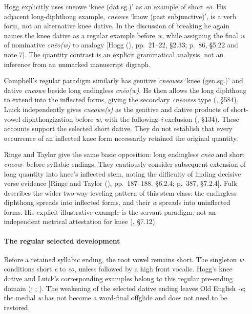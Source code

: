 \documentclass[
  british,
  a4paper,
]{article}
\begin{document}
Hogg explicitly uses {cneowe} `knee (dat.sg.)' as an example of short
\emph{eo}. His adjacent long-diphthong example, \emph{cnēowe} `know
(past subjunctive)', is a verb form, not an alternative knee dative. In
the discussion of breaking he again names the knee dative as a regular
example before \emph{w}, while assigning the final \emph{w} of
nominative \emph{cnēo(w)} to analogy {[}Hogg
(), pp.~21--22, §2.33; p.~86, §5.22
and note 7{]}. The quantity contrast is an explicit grammatical
analysis, not an inference from an unmarked manuscript digraph.

Campbell's regular paradigm similarly has genitive \emph{cneowes} `knee
(gen.sg.)' and dative \emph{cneowe} beside long endingless
\emph{cnēo(w)}. He then allows the long diphthong to extend into the
inflected forms, giving the secondary \emph{cnēowes} type
(, §584). Luick
independently gives \emph{cneowe(s)} as the genitive and dative products
of short-vowel diphthongization before \emph{w}, with the
following-\emph{i} exclusion (, §134). These accounts support the selected short
dative. They do not establish that every occurrence of an inflected knee
form necessarily retained the original quantity.

Ringe and Taylor give the same basic opposition: long endingless
\emph{cnēo} and short \emph{cneow-} before syllabic endings. They
cautiously consider subsequent extension of long quantity into knee's
inflected stem, noting the difficulty of finding decisive verse evidence
{[}Ringe and Taylor (),
pp.~187--188, §6.2.4; p.~387, §7.2.4{]}. Fulk describes the wider
two-way leveling pattern of this stem class: the endingless diphthong
spreads into inflected forms, and their \emph{w} spreads into
uninflected forms. His explicit illustrative example is the servant
paradigm, not an independent metrical attestation for knee
(, §7.12).

\paragraph{The regular selected
development}\label{the-regular-selected-development}

Before a retained syllabic ending, the root vowel remains short. The
singleton \emph{w} conditions short \emph{e} to \emph{eo}, unless
followed by a high front vocalic. Hogg's knee dative and Luick's
corresponding examples belong to this regular pre-ending domain
(;
;
). The
weakening of the selected dative ending leaves Old English \emph{-e};
the medial \emph{w} has not become a word-final offglide and does not
need to be restored.
\end{document}
